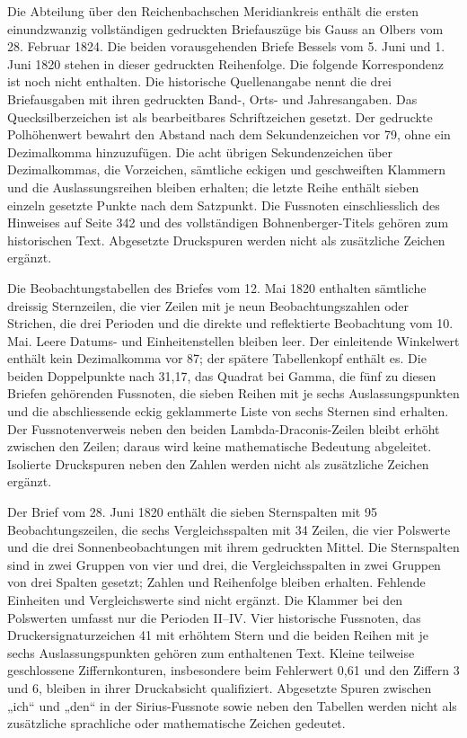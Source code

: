 Die Abteilung über den Reichenbachschen Meridiankreis enthält die ersten einundzwanzig vollständigen gedruckten Briefauszüge bis Gauss an Olbers vom 28. Februar 1824. Die beiden vorausgehenden Briefe Bessels vom 5. Juni und 1. Juni 1820 stehen in dieser gedruckten Reihenfolge. Die folgende Korrespondenz ist noch nicht enthalten. Die historische Quellenangabe nennt die drei Briefausgaben mit ihren gedruckten Band-, Orts- und Jahresangaben. Das Quecksilberzeichen ist als bearbeitbares Schriftzeichen gesetzt. Der gedruckte Polhöhenwert bewahrt den Abstand nach dem Sekundenzeichen vor 79, ohne ein Dezimalkomma hinzuzufügen. Die acht übrigen Sekundenzeichen über Dezimalkommas, die Vorzeichen, sämtliche eckigen und geschweiften Klammern und die Auslassungsreihen bleiben erhalten; die letzte Reihe enthält sieben einzeln gesetzte Punkte nach dem Satzpunkt. Die Fussnoten einschliesslich des Hinweises auf Seite 342 und des vollständigen Bohnenberger-Titels gehören zum historischen Text. Abgesetzte Druckspuren werden nicht als zusätzliche Zeichen ergänzt.

Die Beobachtungstabellen des Briefes vom 12. Mai 1820 enthalten sämtliche dreissig Sternzeilen, die vier Zeilen mit je neun Beobachtungszahlen oder Strichen, die drei Perioden und die direkte und reflektierte Beobachtung vom 10. Mai. Leere Datums- und Einheitenstellen bleiben leer. Der einleitende Winkelwert enthält kein Dezimalkomma vor 87; der spätere Tabellenkopf enthält es. Die beiden Doppelpunkte nach 31,17, das Quadrat bei Gamma, die fünf zu diesen Briefen gehörenden Fussnoten, die sieben Reihen mit je sechs Auslassungspunkten und die abschliessende eckig geklammerte Liste von sechs Sternen sind erhalten. Der Fussnotenverweis neben den beiden Lambda-Draconis-Zeilen bleibt erhöht zwischen den Zeilen; daraus wird keine mathematische Bedeutung abgeleitet. Isolierte Druckspuren neben den Zahlen werden nicht als zusätzliche Zeichen ergänzt.

Der Brief vom 28. Juni 1820 enthält die sieben Sternspalten mit 95 Beobachtungszeilen, die sechs Vergleichsspalten mit 34 Zeilen, die vier Polswerte und die drei Sonnenbeobachtungen mit ihrem gedruckten Mittel. Die Sternspalten sind in zwei Gruppen von vier und drei, die Vergleichsspalten in zwei Gruppen von drei Spalten gesetzt; Zahlen und Reihenfolge bleiben erhalten. Fehlende Einheiten und Vergleichswerte sind nicht ergänzt. Die Klammer bei den Polswerten umfasst nur die Perioden II–IV. Vier historische Fussnoten, das Druckersignaturzeichen 41 mit erhöhtem Stern und die beiden Reihen mit je sechs Auslassungspunkten gehören zum enthaltenen Text. Kleine teilweise geschlossene Ziffernkonturen, insbesondere beim Fehlerwert 0,61 und den Ziffern 3 und 6, bleiben in ihrer Druckabsicht qualifiziert. Abgesetzte Spuren zwischen „ich“ und „den“ in der Sirius-Fussnote sowie neben den Tabellen werden nicht als zusätzliche sprachliche oder mathematische Zeichen gedeutet.

